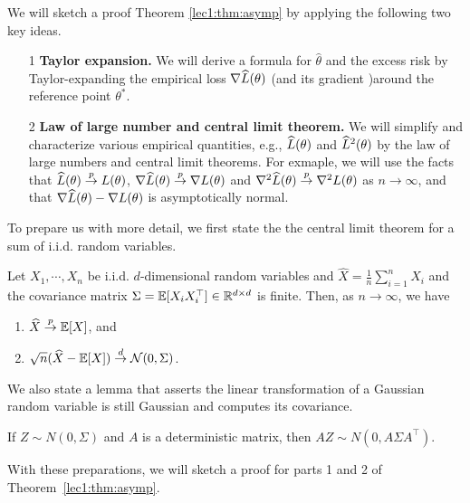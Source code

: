 
We will sketch a proof Theorem \ref{lec1:thm:asymp} by applying the following two key ideas. 
\begin{enumerate}
    \item[1] \textbf{Taylor expansion.} We will derive a formula for $\hat{\theta}$ and the excess risk by Taylor-expanding the empirical loss $\nabla \widehat{L}(\theta)$ (and its gradient )around the reference point $\theta^{*}$.
    \item[2] \textbf{Law of large number and central limit theorem.} We will simplify and characterize various empirical quantities, e.g.,  $\widehat{L}(\theta)$ and $\widehat{L}^2(\theta)$ by the law of large numbers and central limit theorems. For exmaple, we will use the facts that $\widehat{L}(\theta) \overset{p}{\to} L(\theta)$, $\nabla\widehat{L}(\theta) \overset{p}{\to} \nabla L(\theta)$   and  $\nabla^{2}\widehat{L}(\theta) \overset{p}{\to} \nabla^{2} L(\theta)$ as $n \to \infty$, and that $\nabla \widehat{L}(\theta)-\nabla L(\theta)$ is asymptotically normal. 
\end{enumerate}
 
To prepare us with more detail, we first state the the central limit theorem for a sum of i.i.d. random variables.

\begin{theorem} \label{lec1:thm:CLT}
Let $X_1, \cdots, X_n$ be i.i.d. $d$-dimensional random variables and $\widehat{X}=\frac{1}{n} \sum_{i=1}^{n} X_i$ and the covariance matrix $\Sigma = \operatorname*{\mathbb{E}}[X_iX_i^\top]\in \mathbb R^{d\times d}$ is finite. Then, as $n \to \infty$, we have
\begin{enumerate}
    \item $\widehat{X} \overset{p}{\to} \operatorname*{\mathbb{E}}[X]$, and
    \item $\sqrt{n} (\widehat{X}-\operatorname*{\mathbb{E}}[X]) \overset{d}{\to} \mathcal{N}(0,\Sigma)$. %
\end{enumerate}
\end{theorem}

We also state a lemma that asserts the linear transformation of a Gaussian random variable is still Gaussian and computes its covariance. %
\begin{lemma}\label{lec1:lem:dist}
If $Z \sim N(0, \Sigma)$ and $A$ is a deterministic matrix, then $AZ \sim N(0, A \Sigma A^\top)$. 
\end{lemma}
With these preparations, we will sketch a proof for parts 1 and 2 of Theorem~\ref{lec1:thm:asymp}. 

